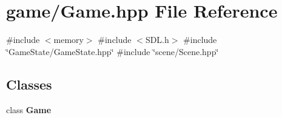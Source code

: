 \section{game/\+Game.hpp File Reference}
\label{_game_8hpp}
{\ttfamily \#include $<$memory$>$}\newline
{\ttfamily \#include $<$S\+D\+L.\+h$>$}\newline
{\ttfamily \#include \char`\"{}Game\+State/\+Game\+State.\+hpp\char`\"{}}\newline
{\ttfamily \#include \char`\"{}scene/\+Scene.\+hpp\char`\"{}}\newline
\subsection*{Classes}
\begin{DoxyCompactItemize}
\item 
class \textbf{ Game}
\end{DoxyCompactItemize}
